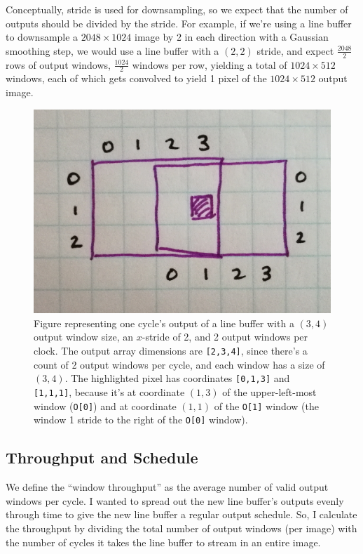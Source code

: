\documentclass[12pt]{article}
\begin{document}
Conceptually, stride is used for downsampling, so we expect that the
number of outputs should be divided by the stride. For example, if
we're using a line buffer to downsample a $2048\times 1024$ image by 2
in each direction with a Gaussian smoothing step, we would use a line
buffer with a $(2,2)$ stride, and expect $\frac{2048}{2}$ rows of
output windows, $\frac{1024}{2}$ windows per row, yielding a total of
$1024\times 512$ windows, each of which gets convolved to yield 1
pixel of the $1024 \times 512$ output image.

\begin{figure}[htb!]
  \centering
  \includegraphics[width=0.6\linewidth]{Figures/lb-format.jpg}
  \caption{Figure representing one cycle's output of a line buffer
    with a $(3,4)$ output window size, an $x$-stride of 2, and 2
    output windows per clock. The output array dimensions are
    \texttt{[2,3,4]}, since there's a count of 2 output windows per
    cycle, and each window has a size of $(3,4)$. The highlighted
    pixel has coordinates \texttt{[0,1,3]} and \texttt{[1,1,1]},
    because it's at coordinate $(1,3)$ of the upper-left-most window
    (\texttt{O[0]}) and at coordinate $(1,1)$ of the \texttt{O[1]}
    window (the window 1 stride to the right of the \texttt{O[0]}
    window).}
  \label{4D_output}
\end{figure}

\subsection{Throughput and Schedule}

We define the ``window throughput'' as the average number of valid
output windows per cycle. I wanted to spread out the new line buffer's
outputs evenly through time to give the new line buffer a regular
output schedule. So, I calculate the throughput by dividing the total
number of output windows (per image) with the number of cycles it
takes the line buffer to stream in an entire image.
\end{document}
